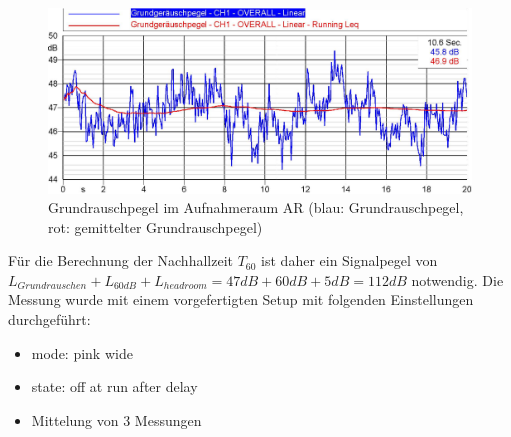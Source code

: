 \documentclass[11pt]{report}
\begin{document}
\begin{figure}[htbp]
\begin{center}
\includegraphics[width=14cm,keepaspectratio=true]{Grundrauschpegel}
\caption{Grundrauschpegel im Aufnahmeraum AR (blau: Grundrauschpegel, rot: gemittelter Grundrauschpegel)}
\label{fig:grundrauschpegel}
\end{center}
\end{figure}
F\"ur die Berechnung der Nachhallzeit $T_{60}$ ist daher ein Signalpegel von $L_{Grundrauschen}+L_{60dB}+L_{headroom}=47dB+60dB+5dB=112dB$ notwendig. Die Messung wurde mit einem vorgefertigten Setup mit folgenden Einstellungen durchgef\"uhrt:
\begin{itemize}
\item mode: pink wide
\item state: off at run after delay
\item Mittelung von 3 Messungen
\end{itemize}
\end{document}
